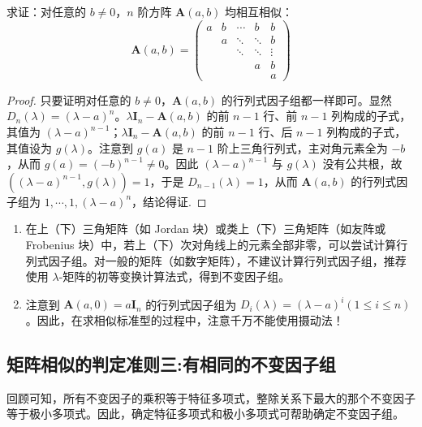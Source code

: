 \documentclass[../../main.tex]{subfiles}%
\begin{document}
\begin{proposition}\label{proposition:A(a,b)矩阵均相似}
求证：对任意的 $b \neq 0$，$n$ 阶方阵 $\boldsymbol{A}(a,b)$ 均相互相似：
\[
\boldsymbol{A}(a,b) = 
\begin{pmatrix}
a & b & \cdots & b & b \\
 & a & \ddots & \ddots & b \\
 & & \ddots & \ddots & \vdots \\
 & & & a & b \\
 & & & & a
\end{pmatrix}
\]
\end{proposition}
\begin{proof}
只要证明对任意的 $b \neq 0$，$\boldsymbol{A}(a,b)$ 的行列式因子组都一样即可。显然 $D_n(\lambda) = (\lambda - a)^n$。$\lambda \boldsymbol{I}_n - \boldsymbol{A}(a,b)$ 的前 $n - 1$ 行、前 $n - 1$ 列构成的子式，其值为 $(\lambda - a)^{n - 1}$；$\lambda \boldsymbol{I}_n - \boldsymbol{A}(a,b)$ 的前 $n - 1$ 行、后 $n - 1$ 列构成的子式，其值设为 $g(\lambda)$。注意到 $g(a)$ 是 $n - 1$ 阶上三角行列式，主对角元素全为 $-b$，从而 $g(a) = (-b)^{n - 1} \neq 0$。因此 $(\lambda - a)^{n - 1}$ 与 $g(\lambda)$ 没有公共根，故 $((\lambda - a)^{n - 1}, g(\lambda)) = 1$，于是 $D_{n - 1}(\lambda) = 1$，从而 $\boldsymbol{A}(a,b)$ 的行列式因子组为 $1, \cdots, 1, (\lambda - a)^n$，结论得证.
\end{proof}
\begin{remark}
\begin{enumerate}[(1)]
\item 在上（下）三角矩阵（如 Jordan 块）或类上（下）三角矩阵（如友阵或 Frobenius 块）中，若上（下）次对角线上的元素全部非零，可以尝试计算行列式因子组。对一般的矩阵（如数字矩阵），不建议计算行列式因子组，推荐使用 $\lambda$-矩阵的初等变换计算法式，得到不变因子组。


\item 注意到 $\boldsymbol{A}(a,0) = a\boldsymbol{I}_n$ 的行列式因子组为 $D_i(\lambda) = (\lambda - a)^i (1 \leqslant  i \leqslant  n)$。因此，在求相似标准型的过程中，注意千万不能使用摄动法！ 
\end{enumerate}
\end{remark}



\subsection{矩阵相似的判定准则三:有相同的不变因子组}

回顾可知，所有不变因子的乘积等于特征多项式，整除关系下最大的那个不变因子等于极小多项式。因此，确定特征多项式和极小多项式可帮助确定不变因子组。
\end{document}
